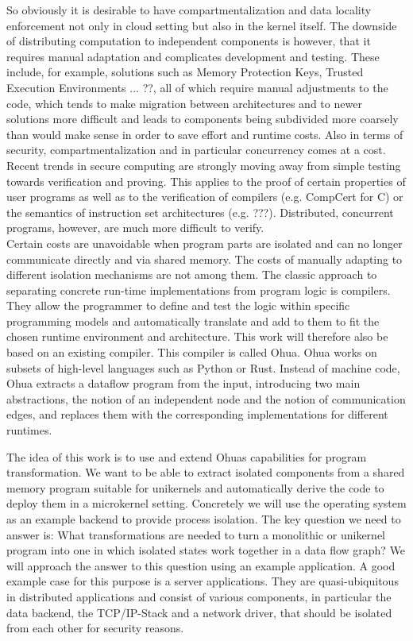 So obviously it is desirable to have compartmentalization and data locality enforcement not only in cloud setting but also in the kernel itself. The downside of distributing computation to independent components is however, that it requires manual adaptation and complicates development and testing. These include, for example, solutions such as Memory Protection Keys, Trusted Execution Environments ... ??, all of which require manual adjustments to the code, which tends to make migration between architectures and to newer solutions more difficult and leads to components being subdivided more coarsely than would make sense in order to save effort and runtime costs. Also in terms of security, compartmentalization and in particular concurrency comes at a cost. Recent trends in secure computing are strongly moving away from simple testing towards verification and proving. This applies to the proof of certain properties of user programs as well as to the verification of compilers (e.g. CompCert\cite{leroy2009formal} for C) or the semantics of instruction set architectures (e.g. ???). Distributed, concurrent programs, however, are much more difficult to verify. \\

Certain costs are unavoidable when program parts are isolated and can no longer communicate directly and via shared memory. The costs of manually adapting to different isolation mechanisms are not among them. The classic approach to separating concrete run-time implementations from program logic is compilers. They allow the programmer to define and test the logic within specific programming models and automatically translate and add to them to fit the chosen runtime environment and architecture.
This work will therefore also be based on an existing compiler. This compiler is called Ohua. Ohua works on subsets of high-level languages such as Python or Rust. Instead of machine code, Ohua extracts a dataflow program from the input, introducing two main abstractions, the notion of an independent node and the notion of communication edges, and replaces them with the corresponding implementations for different runtimes.  


The idea of this work is to use and extend Ohuas capabilities for program transformation. We want to be able to extract isolated components from a shared memory program suitable for unikernels and automatically derive the code to deploy them in a microkernel setting. Concretely we will use the \md operating system as an example backend to provide process isolation. The key question we need to answer is: What transformations are needed to turn a monolithic or unikernel program into one in which isolated states work together in a data flow graph? We will approach the answer to this question using an example application. 
A good example case for this purpose is a server applications. They are quasi-ubiquitous in distributed applications and consist of various components, in particular the data backend, the TCP/IP-Stack and a network driver, that should be isolated from each other for security reasons. 

